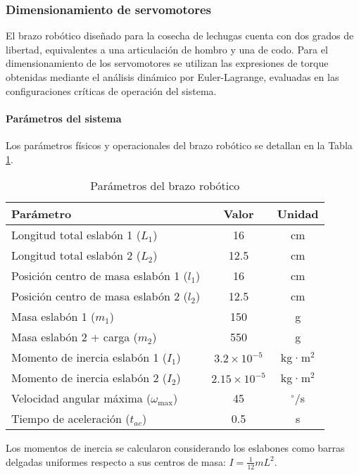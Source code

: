 \subsubsection{Dimensionamiento de servomotores}

El brazo robótico diseñado para la cosecha de lechugas cuenta con dos grados de libertad, equivalentes a una articulación de hombro y una de codo. Para el dimensionamiento de los servomotores se utilizan las expresiones de torque obtenidas mediante el análisis dinámico por Euler-Lagrange, evaluadas en las configuraciones críticas de operación del sistema.

\paragraph{Parámetros del sistema}

Los parámetros físicos y operacionales del brazo robótico se detallan en la Tabla \ref{tab:parametros_brazo}.

\begin{table}[htbp]
\centering
\caption{Parámetros del brazo robótico}
\label{tab:parametros_brazo}
\begin{tabular}{lcc}
\hline
\textbf{Parámetro} & \textbf{Valor} & \textbf{Unidad} \\
\hline
Longitud total eslabón 1 ($L_1$) & 16 & cm \\
Longitud total eslabón 2 ($L_2$) & 12.5 & cm \\
Posición centro de masa eslabón 1 ($l_1$) & 16 & cm \\
Posición centro de masa eslabón 2 ($l_2$) & 12.5 & cm \\
Masa eslabón 1 ($m_1$) & 150 & g \\
Masa eslabón 2 + carga ($m_2$) & 550 & g \\
Momento de inercia eslabón 1 ($I_1$) & $3.2 \times 10^{-5}$ & kg·m$^2$ \\
Momento de inercia eslabón 2 ($I_2$) & $2.15 \times 10^{-5}$ & kg·m$^2$ \\
Velocidad angular máxima ($\omega_{\max}$) & 45 & $^{\circ}$/s \\
Tiempo de aceleración ($t_{ac}$) & 0.5 & s \\
\hline
\end{tabular}
\end{table}

Los momentos de inercia se calcularon considerando los eslabones como barras delgadas uniformes respecto a sus centros de masa: $I = \frac{1}{12}mL^2$.

